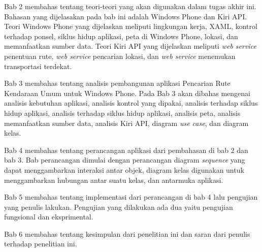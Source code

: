 Bab 2 membahas tentang teori-teori yang akan digunakan dalam tugas akhir ini. Bahasan yang dijelasakan pada bab ini adalah Windows Phone dan Kiri API. Teori Windows Phone yang dijelaskan meliputi lingkungan kerja, XAML, kontrol terhadap ponsel, siklus hidup aplikasi, peta di Windows Phone, lokasi, dan memanfaatkan sumber data. Teori Kiri API yang dijelaskan meliputi \textit{web service} penentuan rute, \textit{web service} pencarian lokasi, dan \textit{web service} menemukan transportasi terdekat. 

Bab 3 membahas tentang analisis pembangunan aplikasi Pencarian Rute Kendaraan Umum untuk Windows Phone. Pada Bab 3 akan dibahas mengenai analisis kebutuhan aplikasi, analisis kontrol yang dipakai, analisis terhadap siklus hidup aplikasi, analisis terhadap siklus hidup aplikasi, analisis peta, analisis memanfaatkan sumber data, analisis Kiri API, diagram \textit{use case}, dan diagram kelas.

Bab 4 membahas tentang perancangan aplikasi dari pembahasan di bab 2 dan bab 3. Bab perancangan dimulai dengan perancangan diagram \textit{sequence} yang dapat menggambarkan interaksi antar objek, diagram kelas digunakan untuk menggambarkan hubungan antar suatu kelas, dan antarmuka aplikasi.

Bab 5 membahas tentang implementasi  dari perancangan di bab 4 lalu pengujian yang penulis lakukan. Pengujian yang dilakukan ada dua yaitu pengujian fungsional dan eksprimental. 

Bab 6 membahas tentang kesimpulan dari penelitian ini dan saran dari penulis terhadap penelitian ini.